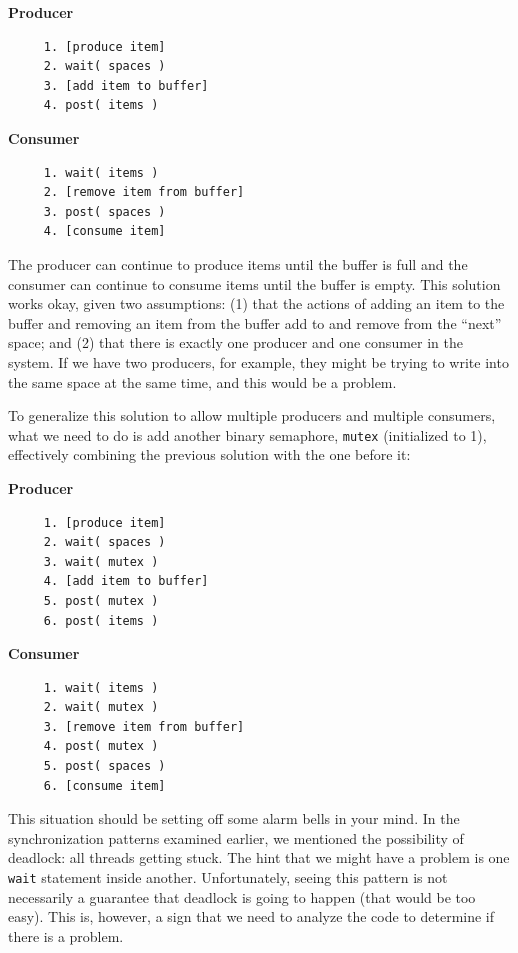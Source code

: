 \documentclass[a4paper]{report}
\begin{document}
\begin{multicols}{2}
	\textbf{Producer}\vspace{-2em}
	\begin{verbatim}
	 1. [produce item]
	 2. wait( spaces )
	 3. [add item to buffer]
	 4. post( items )
  \end{verbatim}
	\columnbreak
	\textbf{Consumer}\vspace{-2em}
	\begin{verbatim}
	 1. wait( items )
	 2. [remove item from buffer]
	 3. post( spaces )
	 4. [consume item]
  \end{verbatim}
\end{multicols}
\vspace{-2em}

The producer can continue to produce items until the buffer is full and the consumer can continue to consume items until the buffer is empty. This solution works okay, given two assumptions: (1) that the actions of adding an item to the buffer and removing an item from the buffer add to and remove from the ``next'' space; and (2) that there is exactly one producer and one consumer in the system. If we have two producers, for example, they might be trying to write into the same space at the same time, and this would be a problem.

To generalize this solution to allow multiple producers and multiple consumers, what we need to do is add another binary semaphore, \texttt{mutex} (initialized to 1), effectively combining the previous solution with the one before it:

\begin{multicols}{2}
	\textbf{Producer}\vspace{-2em}
	\begin{verbatim}
	 1. [produce item]
	 2. wait( spaces )
	 3. wait( mutex )
	 4. [add item to buffer]
	 5. post( mutex )
	 6. post( items )
  \end{verbatim}
	\columnbreak
	\textbf{Consumer}\vspace{-2em}
	\begin{verbatim}
	 1. wait( items )
	 2. wait( mutex )
	 3. [remove item from buffer]
	 4. post( mutex )
	 5. post( spaces )
	 6. [consume item]
  \end{verbatim}
\end{multicols}
\vspace{-2em}

This situation should be setting off some alarm bells in your mind. In the synchronization patterns examined earlier, we mentioned the possibility of deadlock: all threads getting stuck. The hint that we might have a problem is one \texttt{wait} statement inside another. Unfortunately, seeing this pattern is not necessarily a guarantee that deadlock is going to happen (that would be too easy). This is, however, a sign that we need to analyze the code to determine if there is a problem.
\end{document}
